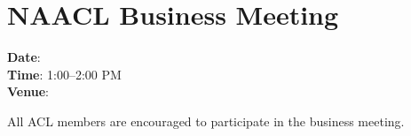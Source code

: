 \section[NAACL Business Meeting]{NAACL Business Meeting}
\thispagestyle{emptyheader}

\textbf{Date}: \daydateyear \\
\textbf{Time}: 1:00--2:00 PM \\
\textbf{Venue}: \BusinessMeetingLoc


All ACL members are encouraged to participate in the business
meeting. 

